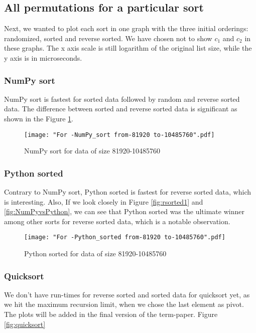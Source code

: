 \documentclass[sigconf, nonacm, natbib, screen, balance=False]{acmart}
\begin{document}
\subsection{All permutations for a particular sort }\label{allpermut}

Next, we wanted to plot each sort in one graph with the three initial orderings: randomized, sorted and reverse sorted. We have chosen not to show $c_1$ and $c_2$ in these graphs. The x axis scale is still logarithm of the original list size, while the y axis is in microseconds.

\subsubsection{NumPy sort}
NumPy sort is fastest for sorted data followed by random and reverse sorted data. The difference between sorted and reverse sorted data is significant as shown in the Figure \ref{fig:NumPysort}.

\begin{figure}[ht]
\texttt{[image: "For -NumPy\_sort from-81920 to-10485760".pdf]}
    \caption{NumPy sort for data of size 81920-10485760 }
    \label{fig:NumPysort}
\end{figure}

\subsubsection{Python sorted}
Contrary to NumPy sort, Python sorted is fastest for reverse sorted data, which is interesting. Also, If we look closely in Figure \ref{fig:rsorted1} and \ref{fig:NumPyvsPython}, we can see that Python sorted was the ultimate winner among other sorts for reverse sorted data, which is a notable observation.

\begin{figure}[ht]
\texttt{[image: "For -Python\_sorted from-81920 to-10485760".pdf]}
    \caption{Python sorted for data of size 81920-10485760 }
    \label{fig:Pythonsorted}
\end{figure}

\subsubsection{Quicksort}
We don't have run-times for reverse sorted and sorted data for quicksort yet, as we hit the maximum recursion limit, when we chose the last element as pivot. The plots will be added in the final version of the term-paper. Figure \ref{fig:quicksort}
\end{document}
